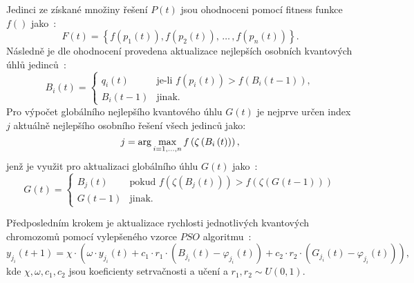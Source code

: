 Jedinci ze získané množiny řešení $P\left(t\right)$ jsou ohodnoceni pomocí fitness funkce $f\left(\right)$ jako~\cite{qse}: 
\begin{equation*}
    F\left(t\right) = \left\{ f\left(p_1\left(t\right)\right), f\left(p_2\left(t\right)\right), \,\dots\,, f\left(p_n\left(t\right)\right) \right\}.
\end{equation*}
Následně je dle ohodnocení provedena aktualizace nejlepších osobních kvantových úhlů jedinců~\cite{qse}:
\begin{equation}\label{eq:pers-best}
    B_i\left(t\right) =
    \begin{cases}
        q_i\left(t\right)   & \text{je-li } f\left(p_i\left(t\right)\right) > f\left(B_i\left(t-1\right)\right), \\
        B_i\left(t-1\right) & \text{jinak.}
    \end{cases}
\end{equation}
Pro výpočet globálního nejlepšího kvantového úhlu $G\left(t\right)$ je nejprve určen index $j$ aktuálně nejlepšího osobního řešení všech jedinců jako:
\begin{equation*}
    j = \arg\max_{i=1,\dots,n} f\left(\zeta\left(B_i\left(t\right)\right)\right),\\[5pt]
\end{equation*}
jenž je využit pro aktualizaci globálního úhlu $G\left(t\right)$ jako~\cite{qse}:
\begin{equation}\label{eq:glob-best}
    G\left(t\right) =
    \begin{cases}
        B_j\left(t\right)   & \text{pokud } f\left(\zeta\left(B_j\left(t\right)\right)\right) > f\left(\zeta\left(G\left(t-1\right)\right)\right) \\
        G\left(t-1\right)   & \text{jinak.}
    \end{cases}
\end{equation}

Předposledním krokem je aktualizace rychlosti jednotlivých kvantových chromozomů pomocí vylepšeného vzorce $PSO$ algoritmu~\cite{qse}: 
\begin{equation}\label{eq:qse-velocity}
    y_{j_i}\left(t+1\right) = \chi \cdot
    \left( \omega \cdot y_{j_i}\left(t\right) 
        + c_1 \cdot r_1 \cdot \left(B_{j_i}\left(t\right) - \varphi_{j_i}\left(t\right) \right)
        + c_2 \cdot r_2 \cdot \left( G_{j_i}\left(t\right) - \varphi_{j_i}\left(t\right) \right)\right),
\end{equation}
kde $\chi, \omega, c_1 , c_2$ jsou koeficienty setrvačnosti a učení a $r_1,r_2\sim U\left(0,1\right)$.  


